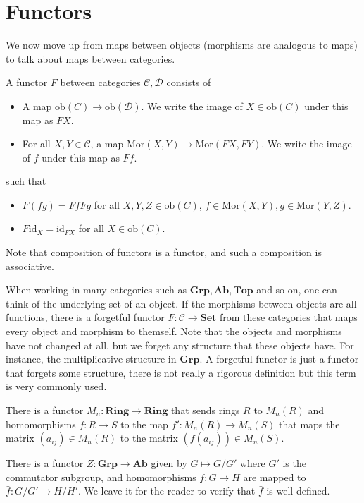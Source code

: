 \documentclass[12pt,reqno]{amsart}
\numberwithin{theorem}{section}
\theoremstyle{definition}
\theoremstyle{remark}
\numberwithin{equation}{section}
\newcommand{\cC}{\mathcal{C}}
\newcommand{\cD}{\mathcal{D}}
\theoremstyle{definition}
\newcommand{\ob}{\mathrm{ob}}
\newcommand{\id}{\mathrm{id}}
\newcommand{\Mor}{\mathrm{Mor}}
\begin{document}
\section{Functors}
We now move up from maps between objects (morphisms are analogous to maps) to talk about maps between categories.
\begin{definition}
    A functor $F$ between categories $\cC,\cD$ consists of
    \begin{itemize}
        \item A map $\ob(C) \rightarrow \ob(\cD)$. We write the image of $X\in \ob(C)$ under this map as $FX$.
        \item For all $X,Y \in \cC$, a map $\Mor(X,Y)\rightarrow \Mor(FX,FY)$. We write the image of $f$ under this map as $Ff$.
    \end{itemize}
    such that 
    \begin{itemize}
        \item $F(fg)=FfFg$ for all $X,Y,Z\in \ob(C)$, $f \in \Mor(X,Y),g \in \Mor(Y,Z)$.
        \item $F\id_X = \id_{FX}$ for all $X \in \ob(C)$.
    \end{itemize}
\end{definition}
Note that composition of functors is a functor, and such a composition is associative.
\begin{example}
    When working in many categories such as $\mathbf{Grp},\mathbf{Ab},\mathbf{Top}$ and so on, one can think of the underlying set of an object. If the morphisms between objects are all functions, there is a forgetful functor $F:\cC \rightarrow \mathbf{Set}$ from these categories that maps every object and morphism to themself. Note that the objects and morphisms have not changed at all, but we forget any structure that these objects have. For instance, the multiplicative structure in $\mathbf{Grp}$. A forgetful functor is just a functor that forgets some structure, there is not really a rigorous definition but this term is very commonly used.
\end{example}
\begin{example}
    There is a functor $M_n:\mathbf{Ring}\rightarrow \mathbf{Ring}$ that sends rings $R$ to $M_n(R)$ and homomorphisms $f:R\rightarrow S$ to the map $f':M_n(R)\rightarrow M_n(S)$ that maps the matrix $(a_{ij}) \in M_n(R)$ to the matrix $(f(a_{ij}))\in M_n(S)$.
\end{example}
\begin{example}
    There is a functor $Z:\mathbf{Grp}\rightarrow\mathbf{Ab}$ given by $G \mapsto G/G'$ where $G'$ is the commutator subgroup, and homomorphisms $f:G\rightarrow H$ are mapped to $\bar f:G/G' \rightarrow H/H'$. We leave it for the reader to verify that $\bar f$ is well defined.
\end{example}
\end{document}

